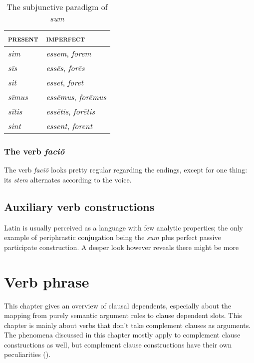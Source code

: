 \documentclass[a4paper, oneside]{report}
\newcommand{\form}[1]{\emph{#1}}
\newcommand*{\category}[1]{\textsc{#1}}
\begin{document}
\begin{table}[H]
    \caption{The subjunctive paradigm of \form{sum}}
    \centering
    \label{tbl:subjunctive-sum}
    \begin{tabular}{ll}
    \toprule
    \category{present}   & \category{imperfect}   \\ \midrule
    \form{sim}       & \form{essem}, \form{forem}       \\
    \form{sīs}   & \form{ess\={e}s}, \form{for\={e}s}   \\
    \form{sit}       & \form{esset}, \form{foret}       \\
    \form{sīmus} & \form{ess\={e}mus}, \form{for\={e}mus} \\
    \form{sītis} & \form{ess\={e}tis}, \form{for\={e}tis} \\
    \form{sint}      & \form{essent}, \form{forent}     \\ \bottomrule
    \end{tabular}
\end{table}

\subsection{The verb \form{faci\={o}}}

The verb \form{faci\={o}} looks pretty regular
regarding the endings, 
except for one thing: 
its \emph{stem} alternates according to the voice.

\section{Auxiliary verb constructions}

Latin is usually perceived as a language with few analytic properties;
the only example of periphrastic conjugation 
being the \form{sum} plus perfect passive participate construction.
A deeper look however reveals 
there might be more 

\chapter{Verb phrase}

This chapter gives an overview of clausal dependents,
especially about the mapping from purely semantic argument roles to clause dependent slots.
This chapter is mainly about verbs that don't take complement clauses as arguments.
The phenomena discussed in this chapter mostly apply to complement clause constructions as well,
but complement clause constructions have their own peculiarities 
().
\end{document}
